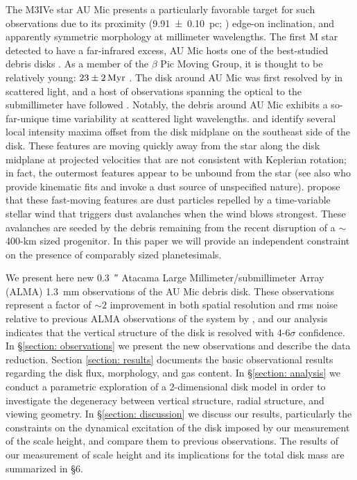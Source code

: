 \documentclass[modern]{aastex62}
\begin{document}
The M3IVe star AU Mic presents a particularly favorable target for such observations due to its proximity (\SI{9.91 \pm 0.10}{pc}; \citealp{vanleeuwen07}) edge-on inclination, and apparently symmetric morphology at millimeter wavelengths.
The first M star detected to have a far-infrared excess, AU Mic hosts one of the best-studied debris disks \citep{moshir90}. 
As a member of the $\beta$ Pic Moving Group, it is thought to be relatively young: $\SI{23 \pm 2}{Myr}$ \citep{binks&jeffries14,mamajek&bell14,malo14}. 
The disk around AU Mic was first resolved by \cite{kalas04} in scattered light, and a host of observations spanning the optical to the submillimeter have followed \citep{augereau&beust06,macgregor13,matthews15,schneider14,wang15}. 
Notably, the debris around AU Mic exhibits a so-far-unique time variability at scattered light wavelengths.
\cite{boccaletti15} and \cite{boccaletti18} identify several local intensity maxima offset from the disk midplane on the southeast side of the disk. 
These features are moving quickly away from the star along the disk midplane at projected velocities that are not consistent with Keplerian rotation; in fact, the outermost features appear to be unbound from the star (see also \citet{sezestre17} who provide kinematic fits and invoke a dust source of unspecified nature). 
\citet{chiang&fung17} propose that these fast-moving features are dust particles repelled by a time-variable stellar wind that triggers dust avalanches when the wind blows strongest. 
These avalanches are seeded by the debris remaining from the recent disruption of a $\sim$400-km sized progenitor. 
In this paper we will provide an independent constraint on the presence of comparably sized planetesimals.

We present here new \SI{0.3}{\arcsecond} Atacama Large Millimeter/submillimeter Array \newline (ALMA) \SI{1.3}{mm} observations of the AU Mic debris disk. 
These observations represent a factor of $\sim 2$ improvement in both spatial resolution and rms noise relative to previous ALMA observations of the system by \cite{macgregor13}, and our analysis indicates that the vertical structure of the disk is resolved with 4-6$\sigma$ confidence.
In \S \ref{section: observations} we present the new observations and describe the data reduction.  
Section \ref{section: results} documents the basic observational results regarding the disk flux, morphology, and gas content.  
In \S \ref{section: analysis} we conduct a parametric exploration of a 2-dimensional disk model in order to investigate the degeneracy between vertical structure, radial structure, and viewing geometry.
In \S \ref{section: discussion} we discuss our results, particularly the constraints on the dynamical excitation of the disk imposed by our measurement of the scale height, and compare them to previous observations.
The results of our measurement of scale height and its implications for the total disk mass are summarized in \S 6.
\end{document}
